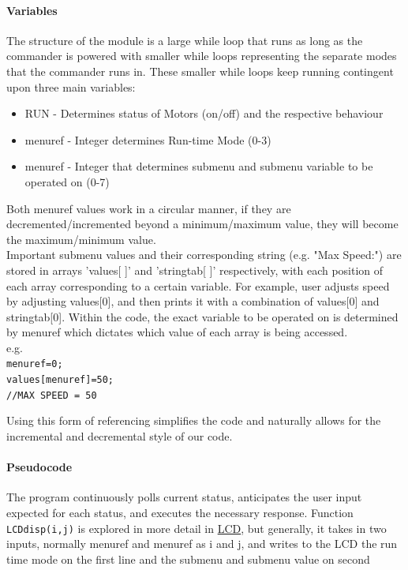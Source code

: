 \documentclass{article}
\begin{document}
	\paragraph{Variables} The structure of the module is a large while loop that runs as long as the commander is powered with smaller while loops representing the separate modes that the commander runs in. These smaller while loops keep running contingent upon three main variables:
	\begin{itemize}
		\item RUN - Determines status of Motors (on/off) and the respective behaviour
		\item menu\textunderscore ref - Integer determines Run-time Mode (0-3)
		\item menu\textunderscore ref - Integer that determines submenu and submenu variable to be operated on (0-7)
	\end{itemize}
	
	Both menu\textunderscore ref values work in a circular manner, if they are decremented/incremented beyond a minimum/maximum value, they will become the maximum/minimum value.\\
	Important submenu values and their corresponding string (e.g. "Max Speed:") are stored in arrays 'values[ ]' and 'stringtab[ ]' respectively, with each position of each array corresponding to a certain variable. For example, user adjusts speed by adjusting values[0], and then prints it with a combination of values[0] and stringtab[0]. Within the code, the exact variable to be operated on is determined by menu\textunderscore ref which dictates which value of each array is being accessed.\\
	
	e.g.\\
	\texttt{menu\textunderscore ref=0;\\values[menu\textunderscore ref]=50;\\//MAX SPEED = 50}
	
	Using this form of referencing simplifies the code and naturally allows for the incremental and decremental style of our code.
	
	\paragraph{Pseudocode}
		The program continuously polls current status, anticipates the user input expected for each status, and executes the necessary response. Function \texttt{LCD\textunderscore disp(i,j)} is explored in more detail in \underline{LCD}, but generally, it takes in two inputs, normally menu\textunderscore ref and menu\textunderscore ref as i and j, and writes to the LCD the run time mode on the first line and the submenu and submenu value on second\\\\
		
\end{document}
